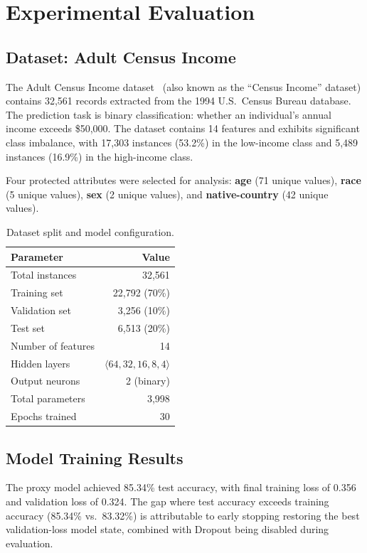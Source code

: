 \chapter{Experimental Evaluation}
\label{ch:evaluation}

\section{Dataset: Adult Census Income}

The Adult Census Income dataset~\cite{adultdataset} (also known as the ``Census Income'' dataset) contains 32,561 records extracted from the 1994 U.S.\ Census Bureau database. The prediction task is binary classification: whether an individual's annual income exceeds \$50,000. The dataset contains 14 features and exhibits significant class imbalance, with 17,303 instances (53.2\%) in the low-income class and 5,489 instances (16.9\%) in the high-income class.

Four protected attributes were selected for analysis: \textbf{age} (71 unique values), \textbf{race} (5 unique values), \textbf{sex} (2 unique values), and \textbf{native-country} (42 unique values).

\begin{table}[H]
\centering
\caption{Dataset split and model configuration.}
\label{tab:dataset}
\begin{tabular}{@{}lr@{}}
\toprule
\textbf{Parameter} & \textbf{Value} \\
\midrule
Total instances & 32,561 \\
Training set & 22,792 (70\%) \\
Validation set & 3,256 (10\%) \\
Test set & 6,513 (20\%) \\
Number of features & 14 \\
Hidden layers & $\langle 64, 32, 16, 8, 4 \rangle$ \\
Output neurons & 2 (binary) \\
Total parameters & 3,998 \\
Epochs trained & 30 \\
\bottomrule
\end{tabular}
\end{table}

\section{Model Training Results}

The proxy model achieved 85.34\% test accuracy, with final training loss of 0.356 and validation loss of 0.324. The gap where test accuracy exceeds training accuracy (85.34\% vs.\ 83.32\%) is attributable to early stopping restoring the best validation-loss model state, combined with Dropout being disabled during evaluation.

